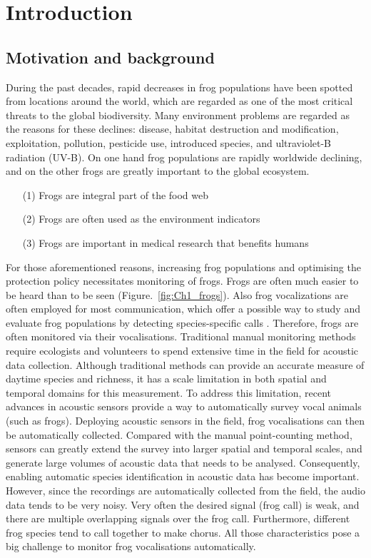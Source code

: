 
\chapter[Introduction]{Introduction}
\label{cha:cha1Introduction}
\section{Motivation and background}
During the past decades, rapid decreases in frog populations have been spotted from locations around the world, which are regarded as one of the most critical threats to the global biodiversity. Many environment problems are regarded as the reasons for these declines: disease, habitat destruction and modification, exploitation, pollution, pesticide use, introduced species, and ultraviolet-B radiation (UV-B). 
On one hand frog populations are rapidly worldwide declining, and on the other frogs are greatly important to the global ecosystem. 
\begin{enumerate}
\item[(1)] Frogs are integral part of the food web
\item[(2)] Frogs are often used as the environment indicators 
\item[(3)] Frogs are important in medical research that benefits humans 
\end{enumerate}

For those aforementioned reasons, increasing frog populations and optimising the protection policy necessitates monitoring of frogs. Frogs are often much easier to be heard than to be seen (Figure.~\ref{fig:Ch1_frogs}). Also frog vocalizations are often employed for most communication, which offer a possible way to study and evaluate frog populations by detecting species-specific calls \citep{dorcas2009auditory}. Therefore, frogs are often monitored via their vocalisations. Traditional manual monitoring methods require ecologists and volunteers to spend extensive time in the field for  acoustic data collection. Although traditional methods can provide an accurate measure of daytime species and richness, it has a scale limitation in both spatial and temporal domains for this measurement.
To address this limitation, recent advances in acoustic sensors provide a way to automatically survey vocal animals (such as frogs). Deploying acoustic sensors in the field, frog vocalisations can then be automatically collected. Compared with the manual point-counting method, sensors can greatly extend the survey into larger spatial and temporal scales, and generate large volumes of acoustic data that needs to be analysed. Consequently, enabling automatic species identification in acoustic data has become important. However, since the recordings are automatically collected from the field, the audio data tends to be very noisy. Very often the desired signal (frog call) is weak, and there are multiple overlapping signals over the frog call. Furthermore, different frog species tend to call together to make chorus. All those characteristics pose a big challenge to monitor frog vocalisations automatically.

